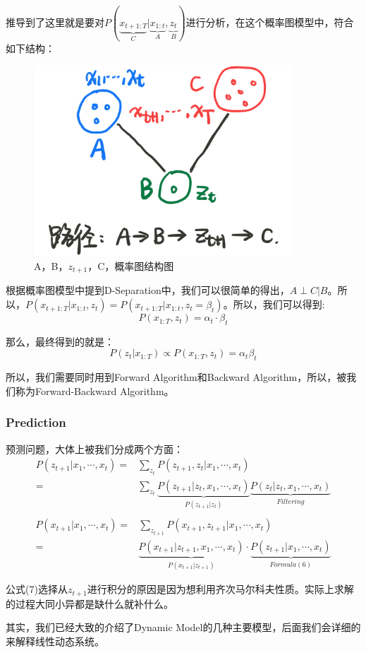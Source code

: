 \documentclass[a4paper]{article}
\begin{document}
推导到了这里就是要对$P(\underbrace{x_{t+1:T}}_{C}|\underbrace{x_{1:t}}_{A},\underbrace{z_t}_{B})$进行分析，在这个概率图模型中，符合如下结构：
\begin{figure}[H]
    \centering
    \includegraphics[width=.45\textwidth]{微信图片_20200110123017.png}
    \caption{A，B，$z_{t+1}$，C，概率图结构图}
    \label{fig:my_label_1}
\end{figure}

根据概率图模型中提到D-Separation中，我们可以很简单的得出，$A\perp C|B$。所以，$P(x_{t+1:T}|x_{1:t},z_t) = P(x_{t+1:T}|x_{1:t},z_t = \beta_t)$。所以，我们可以得到:
\begin{equation}
    P(x_{1:T},z_t) = \alpha_t \cdot \beta_t
\end{equation}

那么，最终得到的就是：
{\color{red}
\begin{equation}
    P(z_t|x_{1:T}) \propto P(x_{1:T},z_t) = \alpha_t\beta_t
\end{equation}
}

所以，我们需要同时用到Forward Algorithm和Backward Algorithm，所以，被我们称为Forward-Backward Algorithm。

\subsubsection{Prediction}
预测问题，大体上被我们分成两个方面：
\begin{equation}
    \begin{split}
        P(z_{t+1}|x_1,\cdots,x_t) = & \sum_{z_t} P(z_{t+1},z_t|x_1,\cdots,x_t) \\ 
        = & \sum_{z_t} \underbrace{P(z_{t+1}|z_t, x_1,\cdots,x_t)}_{P(z_{t+1}|z_t)} \underbrace{P(z_t|z_t, x_1,\cdots,x_t)}_{Filtering} \\
    \end{split}
\end{equation}
\begin{equation}
    \begin{split}
        P(x_{t+1}|x_1,\cdots,x_t) 
        = & \sum_{z_{t+1}} P(x_{t+1},z_{t+1}|x_1,\cdots,x_t) \\ 
        = & \underbrace{P(x_{t+1}|z_{t+1},x_1,\cdots,x_t)}_{P(x_{t+1}|z_{t+1})} \cdot \underbrace{P(z_{t+1}|x_1,\cdots,x_t)}_{Formula (6)}
    \end{split}
\end{equation}

公式(7)选择从$z_{t+1}$进行积分的原因是因为想利用齐次马尔科夫性质。实际上求解的过程大同小异都是缺什么就补什么。

其实，我们已经大致的介绍了Dynamic Model的几种主要模型，后面我们会详细的来解释线性动态系统。
\end{document}
